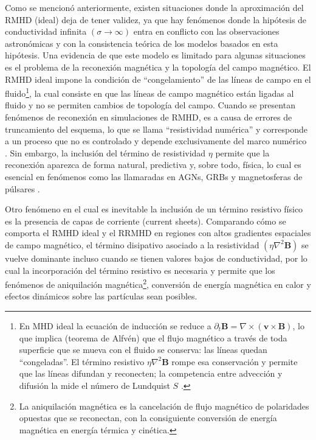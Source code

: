 \primerparrafo Como se mencionó anteriormente, existen situaciones donde la aproximación del RMHD (ideal) deja de tener validez, ya que hay fenómenos donde la hipótesis de conductividad infinita $(\sigma \rightarrow \infty)$ entra en conflicto con las observaciones astronómicas y con la consistencia teórica de los modelos basados en esta hipótesis. Una evidencia de que este modelo es limitado para algunas situaciones es el problema de la reconexión magnética y la topología del campo magnético. El RMHD ideal impone la condición de ``congelamiento'' de las líneas de campo en el fluido\footnote{En MHD ideal la ecuación de inducción se reduce a $\partial_t\mathbf{B}=\nabla\times(\mathbf{v}\times\mathbf{B})$, lo que implica (teorema de Alfvén) que el flujo magnético a través de toda superficie que se mueva con el fluido se conserva: las líneas quedan ``congeladas''. El término resistivo $\eta\nabla^2\mathbf{B}$ rompe esa conservación y permite que las líneas difundan y reconecten; la competencia entre advección y difusión la mide el número de Lundquist $S$ \parencite{goedbloed-2004A}.}, la cual consiste en que las líneas de campo magnético están ligadas al fluido y no se permiten cambios de topología del campo. Cuando se presentan fenómenos de reconexión en simulaciones de RMHD, es a causa de errores de truncamiento del esquema, lo que se llama ``resistividad numérica'' y corresponde a un proceso que no es controlado y depende exclusivamente del marco numérico \parencite{komissarov-2007, mizuno-2013}. Sin embargo, la inclusión del término de resistividad $\eta$ permite que la reconexión aparezca de forma natural, predictiva y, sobre todo, física, lo cual es esencial en fenómenos como las llamaradas en AGNs, GRBs y magnetosferas de púlsares \parencite{miranda-aranguren-2018, palenzuela-2009}.

Otro fenómeno en el cual es inevitable la inclusión de un término resistivo físico es la presencia de capas de corriente (current sheets). Comparando cómo se comporta el RMHD ideal y el RRMHD en regiones con altos gradientes espaciales de campo magnético, el término disipativo asociado a la resistividad $(\eta \nabla^2 \mathbf{B})$ se vuelve dominante incluso cuando se tienen valores bajos de conductividad, por lo cual la incorporación del término resistivo es necesaria y permite que los fenómenos de aniquilación magnética\footnote{La aniquilación magnética es la cancelación de flujo magnético de polaridades opuestas que se reconectan, con la consiguiente conversión de energía magnética en energía térmica y cinética.}, conversión de energía magnética en calor y efectos dinámicos sobre las partículas sean posibles.


